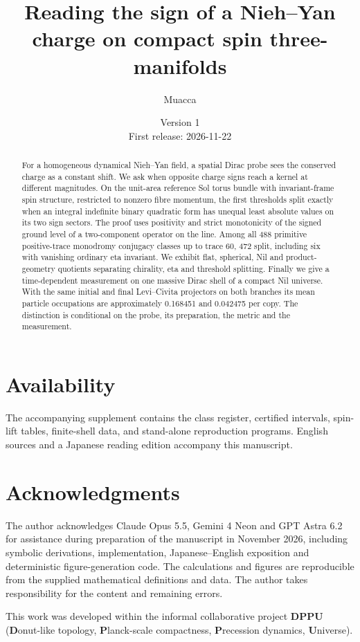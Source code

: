 \documentclass[11pt,a4paper]{article}
\title{Reading the sign of a Nieh--Yan charge on compact spin three-manifolds}
\author{Muacca}
\date{Version 1\\First release: 2026-11-22}
\begin{document}
\maketitle
\begin{abstract}
For a homogeneous dynamical Nieh--Yan field, a spatial Dirac probe sees the conserved charge as a constant shift. We ask when opposite charge signs reach a kernel at different magnitudes. On the unit-area reference Sol torus bundle with invariant-frame spin structure, restricted to nonzero fibre momentum, the first thresholds split exactly when an integral indefinite binary quadratic form has unequal least absolute values on its two sign sectors. The proof uses positivity and strict monotonicity of the signed ground level of a two-component operator on the line. Among all 488 primitive positive-trace monodromy conjugacy classes up to trace 60, 472 split, including six with vanishing ordinary eta invariant. We exhibit flat, spherical, Nil and product-geometry quotients separating chirality, eta and threshold splitting. Finally we give a time-dependent measurement on one massive Dirac shell of a compact Nil universe. With the same initial and final Levi--Civita projectors on both branches its mean particle occupations are approximately 0.168451 and 0.042475 per copy. The distinction is conditional on the probe, its preparation, the metric and the measurement.
\end{abstract}







\section*{Availability}
The accompanying supplement contains the class register, certified intervals, spin-lift tables, finite-shell data, and stand-alone reproduction programs. English sources and a Japanese reading edition accompany this manuscript.
\section*{Acknowledgments}
The author acknowledges Claude Opus 5.5, Gemini 4 Neon and GPT Astra 6.2 for assistance during preparation of the manuscript in November 2026, including symbolic derivations, implementation, Japanese--English exposition and deterministic figure-generation code. The calculations and figures are reproducible from the supplied mathematical definitions and data. The author takes responsibility for the content and remaining errors.

This work was developed within the informal collaborative project \textbf{DPPU} (\textbf{D}onut-like topology, \textbf{P}lanck-scale compactness, \textbf{P}recession dynamics, \textbf{U}niverse).
\appendix










\end{document}
